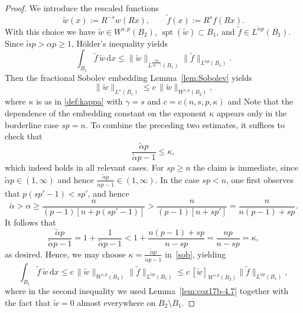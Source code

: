 \documentclass[10pt,letterpaper]{amsart}
\theoremstyle{definition}
\numberwithin{theorem}{section}
\numberwithin{equation}{section}
\newcommand{\1}{\ensuremath{\mathds{1}}}
\newcommand{\dx}{\mathrm{d}x}
\numberwithin{equation}{section}
\begin{document}
\begin{proof}
We introduce the rescaled functions
\[
    \widetilde w(x):= R^{-s} w(Rx),
    \qquad
    \widetilde f(x):= R^{s} f(Rx).
\]
With this choice we have $\widetilde w\in W^{s,p}(B_2)$,
$\operatorname{spt}(\widetilde w)\subset B_1$, and
$\widetilde f\in L^{\tilde\alpha p}(B_1)$.
Since $\tilde\alpha p>\alpha p\ge1$, Hölder’s inequality yields
\[
    \int_{B_1} \widetilde f\,\widetilde w\,\mathrm{d}x
    \le
    \|\widetilde w\|_{L^{\frac{\tilde\alpha p}{\tilde\alpha p-1}}(B_1)}
    \|\widetilde f\|_{L^{\tilde\alpha p}(B_1)}.
\]
Then the fractional Sobolev embedding Lemma~\ref{lem:Sobolev} yields
\begin{equation}\label{sob}
    \|\widetilde w\|_{L^{\kappa}(B_1)}
    \le 
    c\, \|\widetilde w\|_{W^{s,p}(B_2)},
\end{equation}
where $\kappa$ is as in \eqref{def:kappa} with $\gamma=s$ and $c=c(n,s,p,\kappa)$ and 
Note that the dependence of the embedding constant on the exponent $\kappa$ appears only in the borderline case $sp=n$.
To combine the preceding two estimates, it suffices to check that
\[
    \frac{\tilde\alpha p}{\tilde\alpha p-1} \le \kappa,
\]
which indeed holds in all relevant cases. For $sp\ge n$ the claim is immediate, since $\tilde\alpha p\in(1,\infty)$ and hence $\frac{\tilde\alpha p}{\tilde\alpha p-1}\in(1,\infty)$. In the case $sp<n$, one first observes that $p(sp'-1)<sp'$, and hence
\[
    \tilde\alpha > \alpha \ge \frac{n}{(p-1)[n+p(sp'-1)]} > \frac{n}{(p-1)[n+sp']} = \frac{n}{n(p-1)+sp}.
\]
It follows that
\[
    \frac{\tilde\alpha p}{\tilde\alpha p-1} = 1 + \frac{1}{\tilde\alpha p - 1} < 1 + \frac{n(p-1)+sp}{n-sp} = \frac{np}{n-sp} = \kappa,
\]
as desired. Hence, we may choose $\kappa = \frac{\tilde\alpha p}{\tilde\alpha p-1}$ in~\eqref{sob}, yielding
\[
    \int_{B_1} \widetilde f \,\widetilde w\,\dx
    \le 
    c\, \|\widetilde w\|_{W^{s,p}(B_2)} \|\widetilde f\|_{L^{\tilde\alpha p}(B_1)}
    \le 
    c \,[\widetilde w]_{W^{s,p}(B_2)} \|\widetilde f\|_{L^{\tilde\alpha p}(B_1)},
\]
where in the second inequality we used Lemma~\ref{lem:coz17b-4.7} together with the fact that $\widetilde w = 0$ almost everywhere on $B_2\setminus B_1$.

\end{proof}
\end{document}
